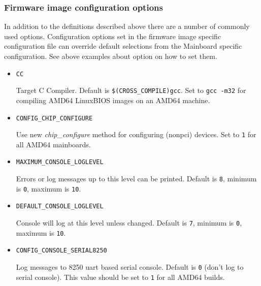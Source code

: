\documentclass[titlepage,12pt]{article}
\begin{document}
\subsubsection{Firmware image configuration options}
In addition to the definitions described above there are a number of
commonly used options. Configuration options set in the firmware image
specific configuration file can override default selections from the
Mainboard specific configuration.  See above examples about
option on how to set them.

\begin{itemize}

\item \begin{verbatim}CC\end{verbatim}

Target C Compiler. Default is \texttt{\$(CROSS\_COMPILE)gcc}. Set to
\texttt{gcc -m32} for compiling AMD64 LinuxBIOS images on an AMD64 
machine.

\item \begin{verbatim}CONFIG_CHIP_CONFIGURE \end{verbatim}

Use new \textit{chip\_configure} method for configuring (nonpci)
devices. Set to \texttt{1} for all AMD64 mainboards.

\item \begin{verbatim}MAXIMUM_CONSOLE_LOGLEVEL\end{verbatim}

Errors or log messages up to this level can be printed. Default is
\texttt{8}, minimum is \texttt{0}, maximum is \texttt{10}.

\item \begin{verbatim}DEFAULT_CONSOLE_LOGLEVEL\end{verbatim}

Console will log at this level unless changed. Default is \texttt{7}, 
minimum is \texttt{0}, maximum is \texttt{10}.

\item \begin{verbatim}CONFIG_CONSOLE_SERIAL8250\end{verbatim}

Log messages to 8250 uart based serial console. Default is \texttt{0}
(don't log to serial console). This value should be set to \texttt{1}
for all AMD64 builds.


\end{itemize}
\end{document}
